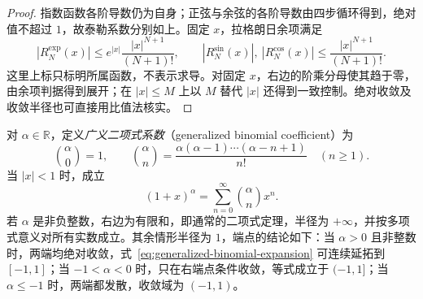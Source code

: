 \begin{proof}
指数函数各阶导数仍为自身；正弦与余弦的各阶导数由四步循环得到，绝对值不超过 $1$，故泰勒系数分别如上。固定 $x$，拉格朗日余项满足
\[
    |R_N^{\exp}(x)|\leq e^{|x|}\frac{|x|^{N+1}}{(N+1)!},
    \qquad
    |R_N^{\sin}(x)|,\ |R_N^{\cos}(x)|
       \leq\frac{|x|^{N+1}}{(N+1)!}.
\]
这里上标只标明所属函数，不表示求导。对固定 $x$，右边的阶乘分母使其趋于零，由余项判据得到展开；在 $|x|\leq M$ 上以 $M$ 替代 $|x|$ 还得到一致控制。绝对收敛及收敛半径也可直接用比值法核实。
\end{proof}

\begin{theorem}[广义二项式展开]
\label{thm:generalized-binomial-series}
对 $\alpha\in\mathbb R$，定义\emph{广义二项式系数}（generalized binomial coefficient）为
\[
    \binom\alpha0=1,\qquad
    \binom\alpha n=\frac{\alpha(\alpha-1)\cdots(\alpha-n+1)}{n!}
    \quad(n\geq1).
\]
当 $|x|<1$ 时，成立
\begin{equation}
    (1+x)^\alpha=\sum_{n=0}^\infty\binom\alpha n x^n.
    \label{eq:generalized-binomial-expansion}
\end{equation}
若 $\alpha$ 是非负整数，右边为有限和，即通常的二项式定理，半径为 $+\infty$，并按多项式意义对所有实数成立。其余情形半径为 $1$，端点的结论如下：当 $\alpha>0$ 且非整数时，两端均绝对收敛，式~\eqref{eq:generalized-binomial-expansion} 可连续延拓到 $[-1,1]$；当 $-1<\alpha<0$ 时，只在右端点条件收敛，等式成立于 $(-1,1]$；当 $\alpha\leq-1$ 时，两端都发散，收敛域为 $(-1,1)$。
\end{theorem}

